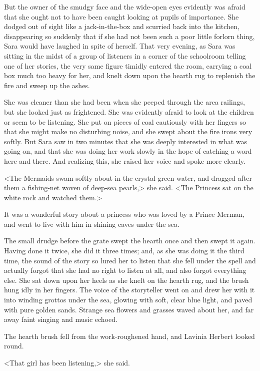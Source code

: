 But the owner of the smudgy face and the wide-open eyes evidently was afraid that she ought not to have been caught looking at pupils of importance. She dodged out of sight like a jack-in-the-box and scurried back into the kitchen, disappearing so suddenly that if she had not been such a poor little forlorn thing, Sara would have laughed in spite of herself. That very evening, as Sara was sitting in the midst of a group of listeners in a corner of the schoolroom telling one of her stories, the very same figure timidly entered the room, carrying a coal box much too heavy for her, and knelt down upon the hearth rug to replenish the fire and sweep up the ashes.

She was cleaner than she had been when she peeped through the area railings, but she looked just as frightened. She was evidently afraid to look at the children or seem to be listening. She put on pieces of coal cautiously with her fingers so that she might make no disturbing noise, and she swept about the fire irons very softly. But Sara saw in two minutes that she was deeply interested in what was going on, and that she was doing her work slowly in the hope of catching a word here and there. And realizing this, she raised her voice and spoke more clearly.

<The Mermaids swam softly about in the crystal-green water, and dragged after them a fishing-net woven of deep-sea pearls,> she said. <The Princess sat on the white rock and watched them.>

It was a wonderful story about a princess who was loved by a Prince Merman, and went to live with him in shining caves under the sea.

The small drudge before the grate swept the hearth once and then swept it again. Having done it twice, she did it three times; and, as she was doing it the third time, the sound of the story so lured her to listen that she fell under the spell and actually forgot that she had no right to listen at all, and also forgot everything else. She sat down upon her heels as she knelt on the hearth rug, and the brush hung idly in her fingers. The voice of the storyteller went on and drew her with it into winding grottos under the sea, glowing with soft, clear blue light, and paved with pure golden sands. Strange sea flowers and grasses waved about her, and far away faint singing and music echoed.

The hearth brush fell from the work-roughened hand, and Lavinia Herbert looked round.

<That girl has been listening,> she said.

